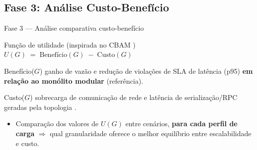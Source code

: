 \subsection{Fase 3: Análise Custo-Benefício}
\label{subsec:fase3}

\begin{frame}{Fase 3 --- Análise comparativa custo-benefício}
    \begin{block}{Função de utilidade (inspirada no CBAM \cite{asundi2001cbam})}
        \centering
        $U(G) \;=\; \text{Benefício}(G) \;-\; \text{Custo}(G)$
    \end{block}
    \vfill
    \begin{exampleblock}{Benefício($G$)}
        \small ganho de vazão e redução de violações de SLA de latência (p95) \textbf{em relação ao monólito modular} (referência).
    \end{exampleblock}
    \begin{alertblock}{Custo($G$)}
        \small sobrecarga de comunicação de rede e latência de serialização/RPC geradas pela topologia \cite{mendonca2024serviceweaver}.
    \end{alertblock}
    \vfill
    \begin{itemize}
        \item Comparação dos valores de $U(G)$ entre cenários, \textbf{para cada perfil de carga} $\Rightarrow$ qual granularidade oferece o melhor equilíbrio entre escalabilidade e custo.
    \end{itemize}
\end{frame}

